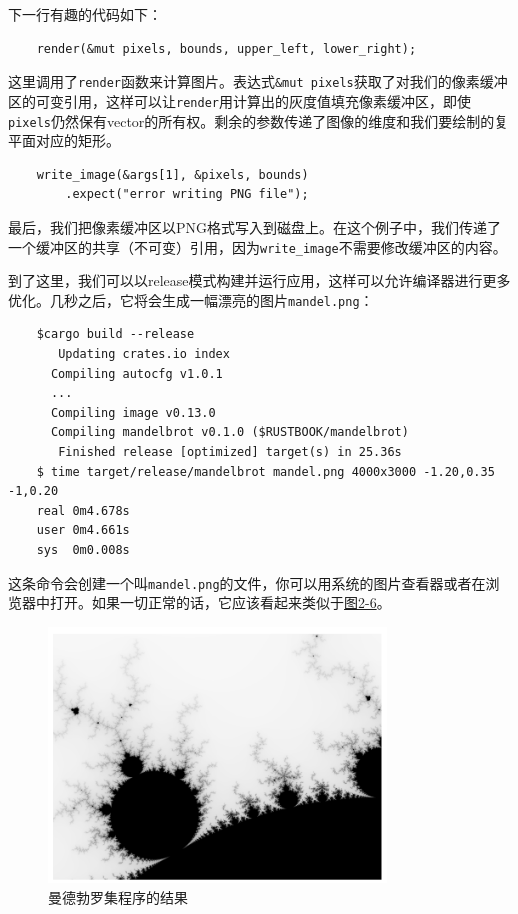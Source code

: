下一行有趣的代码如下：
\begin{verbatim}
    render(&mut pixels, bounds, upper_left, lower_right);
\end{verbatim}
这里调用了\texttt{render}函数来计算图片。表达式\texttt{\&mut pixels}获取了对我们的像素缓冲区的可变引用，这样可以让\texttt{render}用计算出的灰度值填充像素缓冲区，即使\texttt{pixels}仍然保有vector的所有权。剩余的参数传递了图像的维度和我们要绘制的复平面对应的矩形。

\begin{verbatim}
    write_image(&args[1], &pixels, bounds)
        .expect("error writing PNG file");
\end{verbatim}

最后，我们把像素缓冲区以PNG格式写入到磁盘上。在这个例子中，我们传递了一个缓冲区的共享（不可变）引用，因为\texttt{write\_image}不需要修改缓冲区的内容。

到了这里，我们可以以release模式构建并运行应用，这样可以允许编译器进行更多优化。几秒之后，它将会生成一幅漂亮的图片\texttt{mandel.png}：
\begin{verbatim}
    $cargo build --release
       Updating crates.io index
      Compiling autocfg v1.0.1
      ...
      Compiling image v0.13.0
      Compiling mandelbrot v0.1.0 ($RUSTBOOK/mandelbrot)
       Finished release [optimized] target(s) in 25.36s
    $ time target/release/mandelbrot mandel.png 4000x3000 -1.20,0.35 -1,0.20
    real 0m4.678s
    user 0m4.661s
    sys  0m0.008s
\end{verbatim}
这条命令会创建一个叫\texttt{mandel.png}的文件，你可以用系统的图片查看器或者在浏览器中打开。如果一切正常的话，它应该看起来类似于\hyperref[f2-6]{图2-6}。

\begin{figure}[htbp]
    \centering
    \includegraphics[width=0.8\textwidth]{../img/f2-6.png}
    \caption{曼德勃罗集程序的结果}
    \label{f2-6}
\end{figure}

